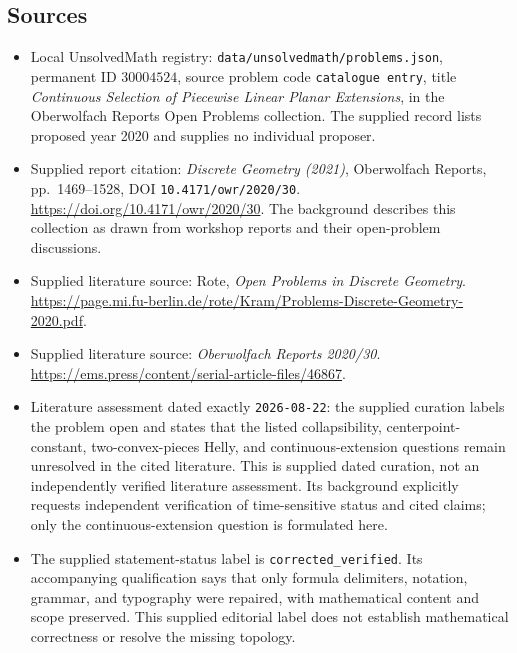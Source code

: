 \documentclass[11pt]{article}
\begin{document}
\subsection{Sources}
\begin{itemize}
\item Local UnsolvedMath registry: \texttt{data/unsolvedmath/problems.json}, permanent ID \(30004524\), source problem code \texttt{catalogue entry}, title \emph{Continuous Selection of Piecewise Linear Planar Extensions}, in the Oberwolfach Reports Open Problems collection. The supplied record lists proposed year 2020 and supplies no individual proposer.
\item Supplied report citation: \emph{Discrete Geometry (2021)}, Oberwolfach Reports, pp.~1469--1528, DOI \texttt{10.4171/owr/2020/30}. \url{https://doi.org/10.4171/owr/2020/30}. The background describes this collection as drawn from workshop reports and their open-problem discussions.
\item Supplied literature source: Rote, \emph{Open Problems in Discrete Geometry}. \url{https://page.mi.fu-berlin.de/rote/Kram/Problems-Discrete-Geometry-2020.pdf}.
\item Supplied literature source: \emph{Oberwolfach Reports 2020/30}. \url{https://ems.press/content/serial-article-files/46867}.
\item Literature assessment dated exactly \texttt{2026-08-22}: the supplied curation labels the problem open and states that the listed collapsibility, centerpoint-constant, two-convex-pieces Helly, and continuous-extension questions remain unresolved in the cited literature. This is supplied dated curation, not an independently verified literature assessment. Its background explicitly requests independent verification of time-sensitive status and cited claims; only the continuous-extension question is formulated here.
\item The supplied statement-status label is \texttt{corrected\_verified}. Its accompanying qualification says that only formula delimiters, notation, grammar, and typography were repaired, with mathematical content and scope preserved. This supplied editorial label does not establish mathematical correctness or resolve the missing topology.
\end{itemize}
\end{document}
